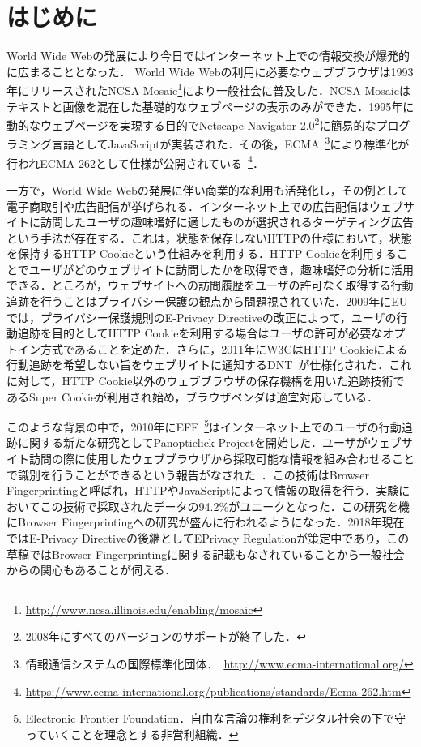 \section{はじめに}
World Wide Webの発展により今日ではインターネット上での情報交換が爆発的に広まることとなった． World Wide Webの利用に必要なウェブブラウザは1993年にリリースされたNCSA Mosaic\footnote{\url{http://www.ncsa.illinois.edu/enabling/mosaic}}により一般社会に普及した．NCSA Mosaicはテキストと画像を混在した基礎的なウェブページの表示のみができた．1995年に動的なウェブページを実現する目的でNetscape Navigator 2.0\footnote{2008年にすべてのバージョンのサポートが終了した．}に簡易的なプログラミング言語としてJavaScriptが実装された．その後，ECMA~\footnote{情報通信システムの国際標準化団体．~\url{http://www.ecma-international.org/}}により標準化が行われECMA-262として仕様が公開されている~\footnote{\url{https://www.ecma-international.org/publications/standards/Ecma-262.htm}}．

一方で，World Wide Webの発展に伴い商業的な利用も活発化し，その例として電子商取引や広告配信が挙げられる．インターネット上での広告配信はウェブサイトに訪問したユーザの趣味嗜好に適したものが選択されるターゲティング広告という手法が存在する．これは，状態を保存しないHTTPの仕様において，状態を保持するHTTP Cookieという仕組みを利用する．HTTP Cookieを利用することでユーザがどのウェブサイトに訪問したかを取得でき，趣味嗜好の分析に活用できる．ところが，ウェブサイトへの訪問履歴をユーザの許可なく取得する行動追跡を行うことはプライバシー保護の観点から問題視されていた．2009年にEUでは，プライバシー保護規則のE-Privacy Directiveの改正によって，ユーザの行動追跡を目的としてHTTP Cookieを利用する場合はユーザの許可が必要なオプトイン方式であることを定めた．さらに，2011年にW3CはHTTP Cookieによる行動追跡を希望しない旨をウェブサイトに通知するDNT~\cite{dnt}が仕様化された．これに対して，HTTP Cookie以外のウェブブラウザの保存機構を用いた追跡技術であるSuper Cookieが利用され始め，ブラウザベンダは適宜対応している． 

このような背景の中で，2010年にEFF~\footnote{Electronic Frontier Foundation．自由な言論の権利をデジタル社会の下で守っていくことを理念とする非営利組織．}はインターネット上でのユーザの行動追跡に関する新たな研究としてPanopticlick Projectを開始した．ユーザがウェブサイト訪問の際に使用したウェブブラウザから採取可能な情報を組み合わせることで識別を行うことができるという報告がなされた~\cite{eckersley2010unique}．この技術はBrowser Fingerprintingと呼ばれ，HTTPやJavaScriptによって情報の取得を行う．実験においてこの技術で採取されたデータの94.2\%がユニークとなった．この研究を機にBrowser Fingerprintingへの研究が盛んに行われるようになった．2018年現在ではE-Privacy Directiveの後継としてEPrivacy Regulationが策定中であり，この草稿ではBrowser Fingerprintingに関する記載もなされていることから一般社会からの関心もあることが伺える．

